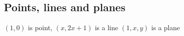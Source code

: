 
\subsection{Points, lines and planes}

\((1,0)\) is point, \((x,2x+1)\) is a line \((1, x, y)\) is a plane

